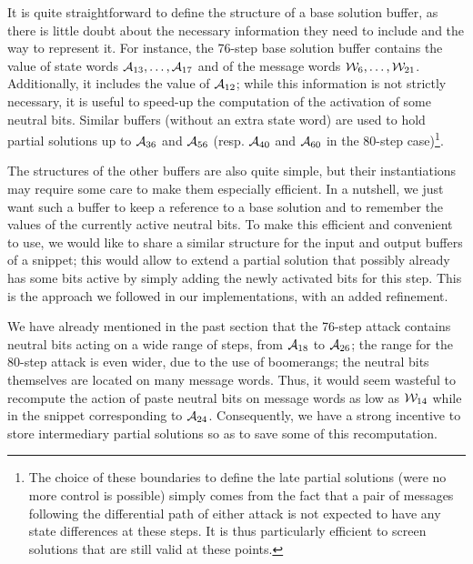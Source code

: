 It is quite straightforward to define the structure of a base solution buffer, as there is little doubt about the necessary information they need
to include and the way to represent it. For instance, the 76-step base solution buffer contains the value of state words $\mathcal{A}_{13},\ldots,\mathcal{A}_{17}$
and of the message words $\mathcal{W}_6,\ldots,\mathcal{W}_{21}$. Additionally, it includes the value of $\mathcal{A}_{12}$; while this information is
not strictly necessary, it is useful to speed-up the computation of the activation of some neutral bits. Similar buffers (without an extra state word)
are used to hold partial solutions up to $\mathcal{A}_{36}$ and $\mathcal{A}_{56}$ (resp. $\mathcal{A}_{40}$ and $\mathcal{A}_{60}$ in the 80-step case)\footnote{The choice
of these boundaries to define the late partial solutions (were no more control is possible) simply comes from the fact that a pair of messages following
the differential path of either attack is not expected to have any state differences at these steps. It is thus particularly efficient to screen
solutions that are still valid at these points.}.

The structures of the other buffers are also quite simple, but their instantiations may require some care to make them especially efficient.
In a nutshell, we just want such a buffer to keep a reference to a base solution and to remember the values of the currently active neutral bits.
To make this efficient and convenient to use, we would like to share a similar structure for the input and output buffers of a snippet; this would
allow to extend a partial solution that possibly already has some bits active by simply adding the newly activated bits for this step. This is the
approach we followed in our implementations, with an added refinement.

\medskip

We have already mentioned in the past section that \eg the 76-step attack contains neutral bits acting on a wide range of steps, from $\mathcal{A}_{18}$
to $\mathcal{A}_{26}$; the range for the 80-step attack is even wider, due to the use of boomerangs; the neutral bits themselves are located on many message
words. Thus, it would seem wasteful to recompute the action of paste neutral bits on message words as low as $\mathcal{W}_{14}$ while in the snippet corresponding
\eg to $\mathcal{A}_{24}$. Consequently, we have a strong incentive to store intermediary partial solutions so as to save some of this recomputation.

